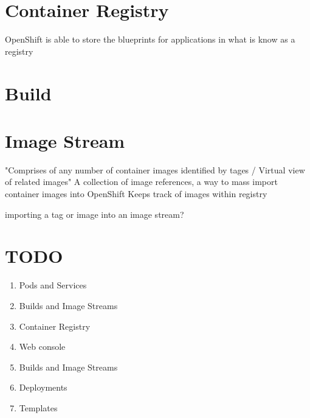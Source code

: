 \documentclass{article}
\begin{document}
\section{Container Registry}
OpenShift is able to store the blueprints for applications in what is know as a registry

\section{Build}

\section{Image Stream}
"Comprises of any number of container images identified by tages / Virtual view of related images"
A collection of image references, a way to mass import container images into OpenShift
Keeps track of images within registry

importing a tag or image into an image stream?

\section{TODO}
\begin{enumerate}
  \item Pods and Services
  \item Builds and Image Streams
  \item Container Registry
  \item Web console
  \item Builds and Image Streams
  \item Deployments
  \item Templates
\end{enumerate}
\end{document}
